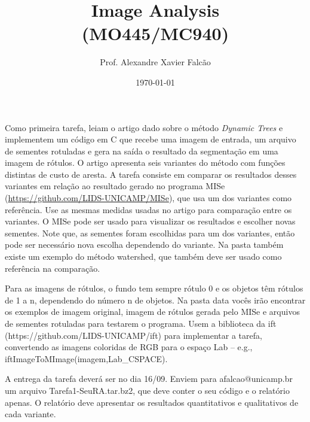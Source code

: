 \documentclass[10pt]{article}
\title{Image Analysis \\ (MO445/MC940)}
\author{Prof. Alexandre Xavier Falc\~ao}
\date{\today}
\begin{document}
\maketitle 

Como primeira tarefa, leiam o artigo dado sobre o método
\textit{Dynamic Trees} e implementem um código em C que recebe uma
imagem de entrada, um arquivo de sementes rotuladas e gera na saída o
resultado da segmentação em uma imagem de rótulos. O artigo apresenta
seis variantes do método com funções distintas de custo de aresta. A
tarefa consiste em comparar os resultados desses variantes em relação
ao resultado gerado no programa MISe
(\url{https://github.com/LIDS-UNICAMP/MISe}), que usa um dos variantes
como referência. Use as mesmas medidas usadas no artigo para
comparação entre os variantes. O MISe pode ser usado para visualizar
os resultados e escolher novas sementes. Note que, as sementes foram
escolhidas para um dos variantes, então pode ser necessário nova
escolha dependendo do variante. Na pasta também existe um exemplo do
método watershed, que também deve ser usado como referência na
comparação.

Para as imagens de rótulos, o fundo tem sempre rótulo 0 e os objetos
têm rótulos de 1 a n, dependendo do número n de objetos. Na pasta data
vocês irão encontrar os exemplos de imagem original, imagem de rótulos
gerada pelo MISe e arquivos de sementes rotuladas para testarem o
programa. Usem a biblioteca da ift
(https://github.com/LIDS-UNICAMP/ift) para implementar a tarefa,
convertendo as imagens coloridas de RGB para o espaço Lab -- e.g.,
iftImageToMImage(imagem,Lab\_CSPACE).

A entrega da tarefa deverá ser no dia 16/09. Enviem para
afalcao@unicamp.br um arquivo Tarefa1-SeuRA.tar.bz2, que deve conter o
seu código e o relatório apenas. O relatório deve apresentar os
resultados quantitativos e qualitativos de cada variante.
\end{document}
